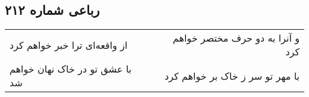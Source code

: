 \begin{center}
\section*{رباعی شماره ۲۱۲}
\label{sec:sh212}
\begin{longtable}{l p{0.5cm} r}
از واقعه‌ای ترا خبر خواهم کرد
&&
و آنرا به دو حرف مختصر خواهم کرد
\\
با عشق تو در خاک نهان خواهم شد
&&
با مهر تو سر ز خاک بر خواهم کرد
\\
\end{longtable}
\end{center}
